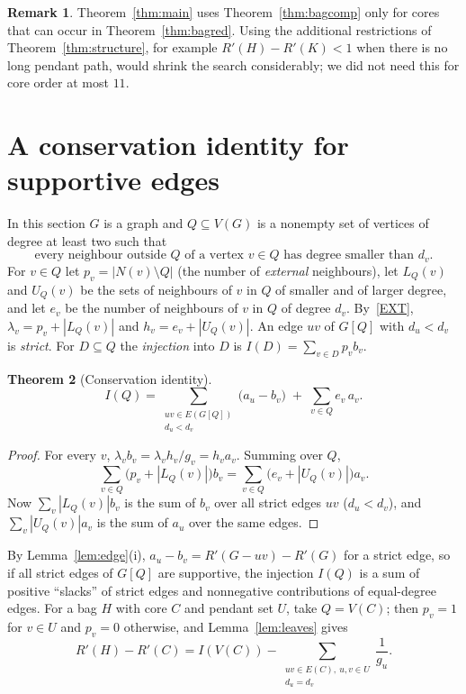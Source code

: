 \documentclass[11pt]{amsart}
\newtheorem{theorem}{Theorem}[section]
\theoremstyle{definition}
\newtheorem{remark}[theorem]{Remark}
\newcommand{\Rp}{R'}
\newcommand{\kmax}{11}
\begin{document}
\begin{remark}
Theorem~\ref{thm:main} uses Theorem~\ref{thm:bagcomp} only for cores that can occur in Theorem~\ref{thm:bagred}. Using the
additional restrictions of Theorem~\ref{thm:structure}, for example $\Rp(H)-\Rp(K)<1$ when there is no long pendant path,
would shrink the search considerably; we did not need this for core order at most $\kmax$.
\end{remark}

\section{A conservation identity for supportive edges}\label{sec:conservation}

In this section $G$ is a graph and $Q\subseteq V(G)$ is a nonempty set of vertices of degree at least two such that
\begin{equation}\label{EXT}\tag{EXT}
\text{every neighbour outside $Q$ of a vertex $v\in Q$ has degree smaller than $d_v$.}
\end{equation}
For $v\in Q$ let $p_v=|N(v)\setminus Q|$ (the number of \emph{external} neighbours), let $L_Q(v)$ and $U_Q(v)$ be the
sets of neighbours of $v$ in $Q$ of smaller and of larger degree, and let $e_v$ be the number of neighbours of $v$ in $Q$
of degree $d_v$. By~\eqref{EXT}, $\lambda_v=p_v+|L_Q(v)|$ and $h_v=e_v+|U_Q(v)|$. An edge $uv$ of $G[Q]$ with $d_u<d_v$
is \emph{strict}. For $D\subseteq Q$ the \emph{injection} into $D$ is $I(D)=\sum_{v\in D}p_vb_v$.

\begin{theorem}[Conservation identity]\label{thm:conservation}
\[
I(Q)=\sum_{\substack{uv\in E(G[Q])\\ d_u<d_v}}\bigl(a_u-b_v\bigr)\;+\;\sum_{v\in Q}e_v\,a_v .
\]
\end{theorem}

\begin{proof}
For every $v$, $\lambda_vb_v=\lambda_vh_v/g_v=h_va_v$. Summing over $Q$,
\[
\sum_{v\in Q}\bigl(p_v+|L_Q(v)|\bigr)b_v=\sum_{v\in Q}\bigl(e_v+|U_Q(v)|\bigr)a_v .
\]
Now $\sum_v|L_Q(v)|b_v$ is the sum of $b_v$ over all strict edges $uv$ ($d_u<d_v$), and $\sum_v|U_Q(v)|a_v$ is the sum
of $a_u$ over the same edges.
\end{proof}

By Lemma~\ref{lem:edge}(i), $a_u-b_v=\Rp(G-uv)-\Rp(G)$ for a strict edge, so if all strict edges of $G[Q]$ are
supportive, the injection $I(Q)$ is a sum of positive ``slacks'' of strict edges and nonnegative contributions of
equal-degree edges. For a bag $H$ with core $C$ and pendant set $U$, take $Q=V(C)$; then $p_v=1$ for $v\in U$ and
$p_v=0$ otherwise, and Lemma~\ref{lem:leaves} gives
\begin{equation}\label{eq:drop}
\Rp(H)-\Rp(C)=I(V(C))-\sum_{\substack{uv\in E(C),\ u,v\in U\\ d_u=d_v}}\frac1{g_u} .
\end{equation}
\end{document}
